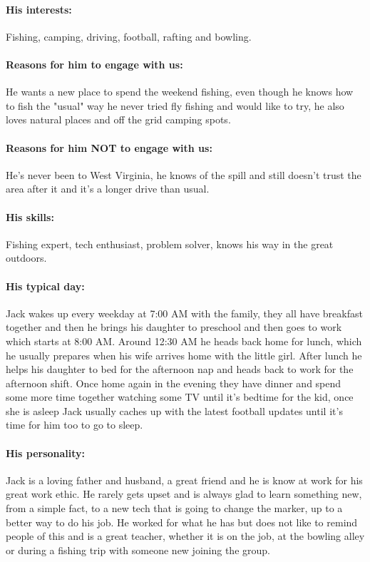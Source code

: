 \paragraph*{His interests:}
Fishing, camping, driving, football, rafting and bowling.
\paragraph*{Reasons for him to engage with us:}
He wants a new place to spend the weekend fishing, even though he knows how to fish the "usual" way he never tried fly fishing and would like to try, he also loves natural places and off the grid camping spots.
\paragraph*{Reasons for him NOT to engage with us:}
He's never been to West Virginia, he knows of the spill and still doesn't trust the area after it and it's a longer drive than usual. 
\paragraph*{His skills:}
Fishing expert, tech enthusiast, problem solver, knows his way in the great outdoors.
\paragraph*{His typical day:}
Jack wakes up every weekday at 7:00 AM with the family, they all have breakfast together and then he brings his daughter to preschool and then goes to work which starts at 8:00 AM. Around 12:30 AM he heads back home for lunch, which he usually prepares when his wife arrives home with the little girl. After lunch he helps his daughter to bed for the afternoon nap and heads back to work for the afternoon shift. Once home again in the evening they have dinner and spend some more time together watching some TV until it's bedtime for the kid, once she is asleep Jack usually caches up with the latest football updates until it's time for him too to go to sleep. 
\paragraph*{His personality:}
Jack is a loving father and husband, a great friend and he is know at work for his great work ethic. He rarely gets upset and is always glad to learn something new, from a simple fact, to a new tech that is going to change the marker, up to a better way to do his job. He worked for what he has but does not like to remind people of this and is a great teacher, whether it is on the job, at the bowling alley or during a fishing trip with someone new joining the group.  
